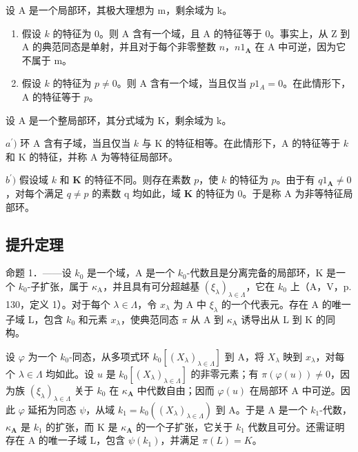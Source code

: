 设 A 是一个局部环，其极大理想为 m，剩余域为 k。

\begin{enumerate}
\def\labelenumi{\alph{enumi})}
\item
  假设 \(k\) 的特征为 0。则 A 含有一个域，且 A 的特征等于 0。事实上，从 Z 到 A 的典范同态是单射，并且对于每个非零整数 \(n\)，\(n1_{\mathbf{A}}\) 在 A 中可逆，因为它不属于 m。
\item
  假设 \(k\) 的特征为 \(p \neq 0\)。则 A 含有一个域，当且仅当 \(p1_{A} = 0\)。在此情形下，A 的特征等于 \(p\)。
\end{enumerate}

设 A 是一个整局部环，其分式域为 K，剩余域为 k。

\(a^{\prime})\) 环 A 含有子域，当且仅当 \(k\) 与 K 的特征相等。在此情形下，A 的特征等于 \(k\) 和 K 的特征，并称 A 为等特征局部环。

\(b^{\prime})\) 假设域 \(k\) 和 \(\mathbf{K}\) 的特征不同。则存在素数 \(p\)，使 \(k\) 的特征为 \(p\)。由于有 \(q1_{\mathbf{A}} \neq 0\)，对每个满足 \(q \neq p\) 的素数 q 均如此，域 \(\mathbf{K}\) 的特征为 0。于是称 A 为非等特征局部环。

\subsection{提升定理}

命题 1．——设 \(k_{0}\) 是一个域，A 是一个 \(k_{0}\)-代数且是分离完备的局部环，K 是一个 \(k_{0}\)-子扩张，属于 \(\kappa_{\mathrm{A}}\)，并且具有可分超越基 \((\xi_{\lambda})_{\lambda \in \Lambda}\)，它在 \(k_{0}\) 上（A，V，p. 130，定义 1）。对于每个 \(\lambda \in \Lambda\)，令 \(x_{\lambda}\) 为 A 中 \(\xi_{\lambda}\) 的一个代表元。存在 A 的唯一子域 L，包含 \(k_{0}\) 和元素 \(x_{\lambda}\)，使典范同态 \(\pi\) 从 A 到 \(\kappa_{\mathrm{A}}\) 诱导出从 L 到 K 的同构。

设 \(\varphi\) 为一个 \(k_{0}\)-同态，从多项式环 \(k_{0}[(X_{\lambda})_{\lambda \in \Lambda}]\) 到 A，将 \(X_{\lambda}\) 映到 \(x_{\lambda}\)，对每个 \(\lambda \in \Lambda\) 均如此。设 \(u\) 是 \(k_{0}[(X_{\lambda})_{\lambda \in \Lambda}]\) 的非零元素；有 \(\pi (\varphi (u)) \neq 0\)，因为族 \((\xi_{\lambda})_{\lambda \in \Lambda}\) 关于 \(k_{0}\) 在 \(\kappa_{\mathbf{A}}\) 中代数自由；因而 \(\varphi (u)\) 在局部环 A 中可逆。因此 \(\varphi\) 延拓为同态 \(\psi\)，从域 \(k_{1} = k_{0}((X_{\lambda})_{\lambda \in \Lambda})\) 到 A。于是 A 是一个 \(k_{1}\)-代数，\(\kappa_{\mathbf{A}}\) 是 \(k_{1}\) 的扩张，而 K 是 \(\kappa_{\mathbf{A}}\) 的一个子扩张，它关于 \(k_{1}\) 代数且可分。还需证明存在 A 的唯一子域 L，包含 \(\psi(k_{1})\)，并满足 \(\pi(L) = K\)。

